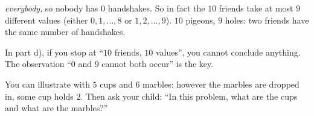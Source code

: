 {\begin{proofbox}
\emph{everybody}, so nobody has $0$ handshakes. So in fact the $10$ friends take at most $9$ different values (either $0, 1, \dots, 8$ or
$1, 2, \dots, 9$). $10$ pigeons, $9$ holes: two friends have the same number of handshakes.\end{proofbox}
\begin{warnbox}In part d), if you stop at ``$10$ friends, $10$ values'', you cannot conclude anything. The observation ``$0$ and $9$ cannot
both occur'' is the key.\end{warnbox}
\begin{parentbox}You can illustrate with $5$ cups and $6$ marbles: however the marbles are dropped in, some cup holds $2$. Then ask your
child: ``In this problem, what are the cups and what are the marbles?''\end{parentbox}
}
